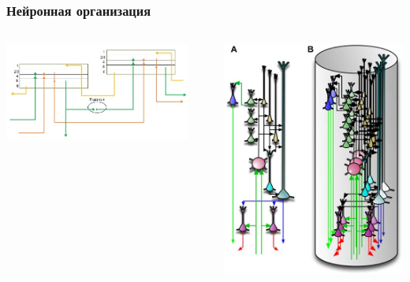 \documentclass[default]{beamer}
\begin{document}
	\begin{frame}
		\frametitle{Нейронная организация}
		
		\begin{columns}
			\begin{column}{0.65\textwidth}
				\includegraphics[width=0.9\textwidth]{mpf/regions_connect}
			\end{column}
			\begin{column}{0.35\textwidth}
				\includegraphics[width=\textwidth]{phisio/column}
			\end{column}
		\end{columns}
		\nocite{*}
		\printbibliography[keyword={simplehtm}, resetnumbers=true]
	\end{frame}
	
\end{document}

